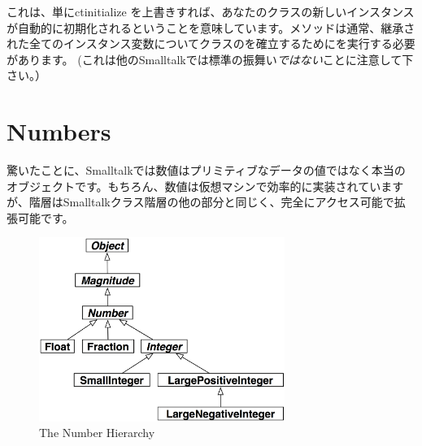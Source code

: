 \documentclass[a4paper,10pt,twoside]{book}
\begin{document}
これは、単にct{initialize} を上書きすれば、あなたのクラスの新しいインスタンスが自動的に初期化されるということを意味しています。メソッドは通常、継承された全てのインスタンス変数についてクラスのを確立するためにを実行する必要があります。
(これは他のSmalltalkでは標準の振舞い\emph{ではない}ことに注意して下さい。）

\section{Numbers}
驚いたことに、Smalltalkでは数値はプリミティブなデータの値ではなく本当のオブジェクトです。もちろん、数値は仮想マシンで効率的に実装されていますが、階層はSmalltalkクラス階層の他の部分と同じく、完全にアクセス可能で拡張可能です。

\begin{figure}[ht]
\centerline {\includegraphics[width=8cm]{NumberHierarchy}}
\caption{The Number Hierarchy }
\end{figure}
\end{document}
